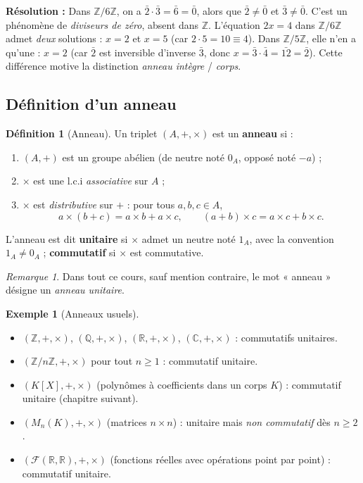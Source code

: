 \documentclass[12pt,a4paper]{report}
\theoremstyle{definition}
\newtheorem{definition}{Définition}[section]
\newtheorem{exemple}{Exemple}[section]
\theoremstyle{remark}
\newtheorem{remarque}{Remarque}[section]
\begin{document}
\textbf{Résolution :} Dans $\mathbb{Z}/6\mathbb{Z}$, on a $\bar{2} \cdot \bar{3} = \bar{6} = \bar{0}$, alors que $\bar{2} \neq \bar{0}$ et $\bar{3} \neq \bar{0}$. C'est un phénomène de \emph{diviseurs de zéro}, absent dans $\mathbb{Z}$.
L'équation $2x = 4$ dans $\mathbb{Z}/6\mathbb{Z}$ admet \emph{deux} solutions : $x = 2$ et $x = 5$ (car $2 \cdot 5 = 10 \equiv 4$). Dans $\mathbb{Z}/5\mathbb{Z}$, elle n'en a qu'une : $x = 2$ (car $\bar{2}$ est inversible d'inverse $\bar{3}$, donc $x = \bar{3} \cdot \bar{4} = \bar{12} = \bar{2}$). Cette différence motive la distinction \emph{anneau intègre} / \emph{corps}.

\subsection{Définition d'un anneau}

\begin{definition}[Anneau]
Un triplet $(A, +, \times)$ est un \textbf{anneau} si :
\begin{enumerate}
    \item $(A, +)$ est un groupe abélien (de neutre noté $0_A$, opposé noté $-a$) ;
    \item $\times$ est une l.c.i \emph{associative} sur $A$ ;
    \item $\times$ est \emph{distributive} sur $+$ : pour tous $a, b, c \in A$,
    \[ a \times (b + c) = a \times b + a \times c, \qquad (a + b) \times c = a \times c + b \times c. \]
\end{enumerate}
L'anneau est dit \textbf{unitaire} si $\times$ admet un neutre noté $1_A$, avec la convention $1_A \neq 0_A$ ; \textbf{commutatif} si $\times$ est commutative.
\end{definition}

\begin{remarque}
Dans tout ce cours, sauf mention contraire, le mot « anneau » désigne un \emph{anneau unitaire}.
\end{remarque}

\begin{exemple}[Anneaux usuels]
\begin{itemize}
    \item $(\mathbb{Z}, +, \times)$, $(\mathbb{Q}, +, \times)$, $(\mathbb{R}, +, \times)$, $(\mathbb{C}, +, \times)$ : commutatifs unitaires.
    \item $(\mathbb{Z}/n\mathbb{Z}, +, \times)$ pour tout $n \ge 1$ : commutatif unitaire.
    \item $(K[X], +, \times)$ (polynômes à coefficients dans un corps $K$) : commutatif unitaire (chapitre suivant).
    \item $(M_n(K), +, \times)$ (matrices $n \times n$) : unitaire mais \emph{non commutatif} dès $n \ge 2$.
    \item $(\mathcal{F}(\mathbb{R}, \mathbb{R}), +, \times)$ (fonctions réelles avec opérations point par point) : commutatif unitaire.
\end{itemize}
\end{exemple}
\end{document}
